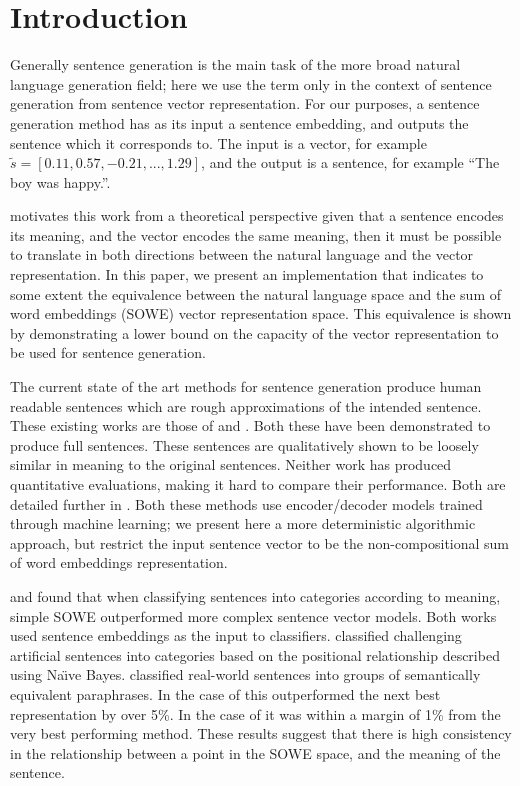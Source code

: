 {\section{Introduction} \label{intro}
Generally sentence generation is the main task of the more broad natural language generation field; here we use the term only in the context of sentence generation from sentence vector representation. For our purposes, a sentence generation method has as its input a sentence embedding, and outputs the sentence which it corresponds to. The input is a vector, for example $\tilde{s}=[0.11, 0.57,-0.21,...,1.29]$, and the output is a sentence, for example ``The boy was happy.''.

\textcite{Dinu2014CompositionalGeneration} motivates this work from a theoretical perspective given that a sentence encodes its meaning, and the vector encodes the same meaning, then it must be possible to translate in both directions between the natural language and the vector representation. In this paper, we present an implementation that indicates to some extent the equivalence between the natural language space and the sum of word embeddings (SOWE) vector representation space. This equivalence is shown by demonstrating a lower bound on the capacity of the vector representation to be used for sentence generation. 


The current state of the art methods for sentence generation produce human readable sentences which are rough approximations of the intended sentence. These existing works are those of  \textcite{iyyer2014generating} and \textcite{Bowman2015SmoothGeneration}. Both these have been demonstrated to produce full sentences. These sentences are qualitatively shown to be loosely similar in meaning to the original sentences. Neither work has produced quantitative evaluations, making it hard to compare their performance. Both are detailed further in . Both these methods use encoder/decoder models trained through machine learning; we present here a more deterministic algorithmic approach, but restrict the input sentence vector to be the non-compositional sum of word embeddings representation.

\textcite{RitterPosition} and \textcite{White2015SentVecMeaning} found that when classifying sentences into categories according to meaning, simple SOWE outperformed more complex sentence vector models. Both works used sentence embeddings as the input to classifiers. \textcite{RitterPosition} classified challenging artificial sentences into categories based on the positional relationship described using Na{\"\i}ve Bayes. \textcite{White2015SentVecMeaning} classified real-world sentences into groups of semantically equivalent paraphrases. In the case of \textcite{RitterPosition} this outperformed the next best representation by over 5\%. In the case of \textcite{White2015SentVecMeaning} it was within a margin of 1\% from the very best performing method. These results suggest that there is high consistency in the relationship between a point in the SOWE space, and the meaning of the sentence. 

}
